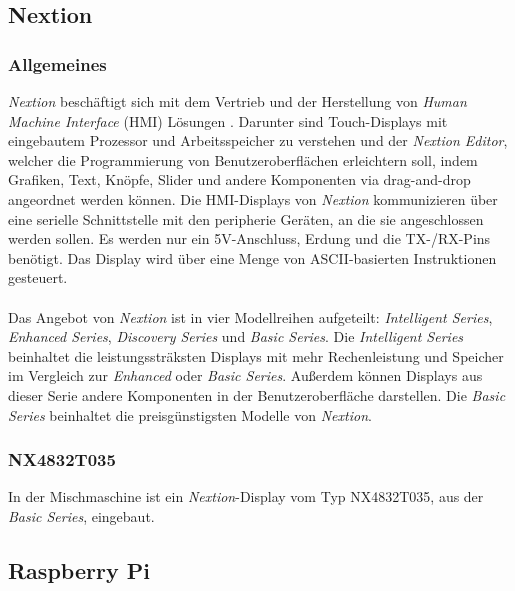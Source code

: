 \subsection{Nextion}
\subsubsection{Allgemeines}
\textit{Nextion} beschäftigt sich mit dem Vertrieb und der Herstellung von \textit{Human Machine Interface} (HMI) Lösungen \cite{zhou_home_nodate}. Darunter sind Touch-Displays mit eingebautem Prozessor und Arbeitsspeicher zu verstehen und der \textit{Nextion Editor}, welcher die Programmierung von Benutzeroberflächen erleichtern soll, indem Grafiken, Text, Knöpfe, Slider und andere Komponenten via drag-and-drop angeordnet werden können. Die HMI-Displays von \textit{Nextion} kommunizieren über eine serielle Schnittstelle mit den peripherie Geräten, an die sie angeschlossen werden sollen. Es werden nur ein 5V-Anschluss, Erdung und die TX-/RX-Pins benötigt. Das Display wird über eine Menge von ASCII-basierten Instruktionen gesteuert.\\\\
Das Angebot von \textit{Nextion} ist in vier Modellreihen aufgeteilt: \textit{Intelligent Series}, \textit{Enhanced Series}, \textit{Discovery Series} und \textit{Basic Series}. Die \textit{Intelligent Series} beinhaltet die leistungssträksten Displays mit mehr Rechenleistung und Speicher im Vergleich zur \textit{Enhanced} oder \textit{Basic Series}. Außerdem können Displays aus dieser Serie andere Komponenten in der Benutzeroberfläche darstellen. Die \textit{Basic Series} beinhaltet die preisgünstigsten Modelle von \textit{Nextion}.
\subsubsection{NX4832T035}
In der Mischmaschine ist ein \textit{Nextion}-Display vom Typ NX4832T035, aus der \textit{Basic Series}, eingebaut.
\subsection{Raspberry Pi}

